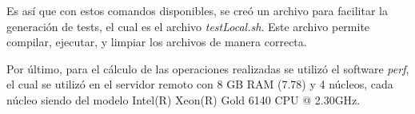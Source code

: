 Es así que con estos comandos disponibles, se creó un archivo para facilitar la generación de tests, el cual es el archivo \textit{testLocal.sh}. Este archivo permite compilar, ejecutar, y limpiar los archivos de manera correcta.

Por último, para el cálculo de las operaciones realizadas se utilizó el software \textit{perf}, el cual se utilizó en el servidor remoto con 8 GB RAM (7.78) y 4 núcleos, cada núcleo siendo del modelo Intel(R) Xeon(R) Gold 6140 CPU @ 2.30GHz. 